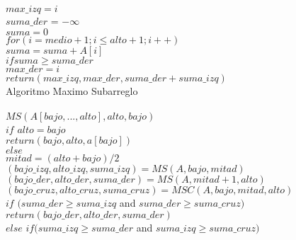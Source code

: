 \documentclass[12pt,twoside]{article}
\begin{document}
\hspace*{3cm}$max\_izq = i$\\
\hspace*{2cm}$suma\_der$ = $-\infty$\\
\hspace*{2cm}$suma = 0$\\
\hspace*{2cm}$for(i=medio+1;i \leq alto+1;i++)$\\
\hspace*{2.5cm}$suma = suma + A[i]$\\
\hspace*{2.5cm}$if suma \geq suma\_der$\\
\hspace*{3cm}$max\_der = i$\\
\hspace*{2cm}$return (max\_izq, max\_der, suma\_der + suma\_izq)$\\\newpage
Algoritmo Maximo Subarreglo\\\\
\hspace*{1cm}$MS(A[bajo,...,alto],alto,bajo)$\\
\hspace*{2cm}$if$ $alto = bajo$\\
\hspace*{2.5cm}$return (bajo, alto, a[bajo])$\\
\hspace*{2cm}$else$\\
\hspace*{2.5cm}$mitad = (alto+bajo)/2$\\
\hspace*{2.5cm}$(bajo\_izq, alto\_izq, suma\_izq) = MS(A, bajo, mitad)$\\
\hspace*{2.5cm}$(bajo\_der, alto\_der, suma\_der) = MS(A, mitad+1, alto)$\\
\hspace*{2.5cm}$(bajo\_cruz, alto\_cruz, suma\_cruz) = MSC(A, bajo, mitad, alto)$\\
\hspace*{2cm}$if$ $(suma\_der \geq suma\_izq$ and $suma\_der \geq suma\_cruz)$\\
\hspace*{2.5cm}$return (bajo\_der, alto\_der, suma\_der)$\\
\hspace*{2cm}$else$ $if (suma\_izq \geq suma\_der$ and $suma\_izq \geq suma\_cruz)$\\
\end{document}
